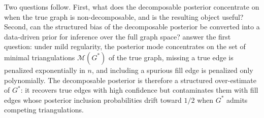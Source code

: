Two questions follow. First, what does the decomposable posterior concentrate on when the true graph is non-decomposable, and is the resulting object useful? Second, can the structured bias of the decomposable posterior be converted into a data-driven prior for inference over the full graph space? \textcite{niu2020bayesian} answer the first question: under mild regularity, the posterior mode concentrates on the set of minimal triangulations $\mathcal{M}(G^*)$ of the true graph, missing a true edge is penalized exponentially in $n$, and including a spurious fill edge is penalized only polynomially. The decomposable posterior is therefore a structured over-estimate of $G^*$: it recovers true edges with high confidence but contaminates them with fill edges whose posterior inclusion probabilities drift toward $1/2$ when $G^*$ admits competing triangulations.

